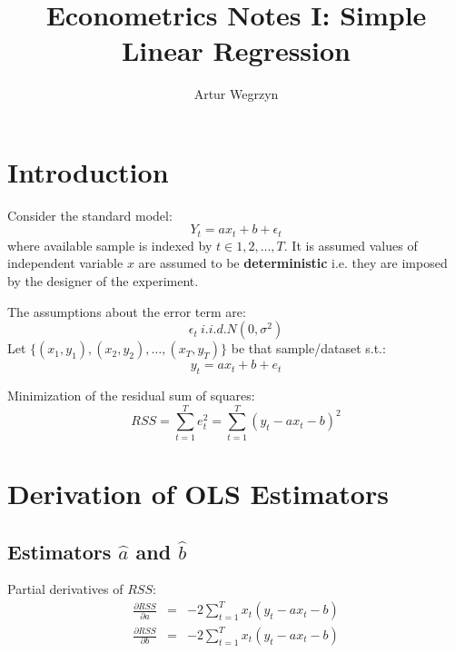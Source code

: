 \documentclass[12pt]{article}
\begin{document}
\title{Econometrics Notes I: Simple Linear Regression}
\author{Artur Wegrzyn}
\maketitle


\tableofcontents


\section{Introduction}

Consider the standard model:
\begin{equation}
Y_t = a x_t + b +\epsilon_t
\end{equation}
where available sample is indexed by $t \in {1, 2, \dots, T}$. It is assumed values of independent variable $x$ are assumed to be \textbf{deterministic} i.e. they are imposed by the designer of the experiment.

The assumptions about the error term are:
\begin{equation}
\epsilon_t ~ i.i.d. N(0, \sigma^2)
\end{equation}
Let $\{(x_1, y_1), (x_2, y_2), \dots, (x_T, y_T)\}$ be that sample/dataset s.t.:
\begin{equation}
y_t = a x_t + b + e_t
\end{equation}

Minimization of the residual sum of squares:
\begin{equation}
RSS = \sum_{t=1}^{T} e_t^2 = \sum_{t=1}^{T}(y_t - a x_t - b)^2
\end{equation}

\section{Derivation of OLS Estimators}

\subsection{Estimators $\hat{a}$ and $\hat{b}$}
Partial derivatives of $RSS$:
\begin{eqnarray}
\frac{\partial RSS}{\partial a} &=& -2 \sum_{t=1}^{T}x_t (y_t - ax_t -b) \\
\frac{\partial RSS}{\partial b} &=& -2 \sum_{t=1}^{T}x_t (y_t - ax_t -b)
\end{eqnarray}
\end{document}
